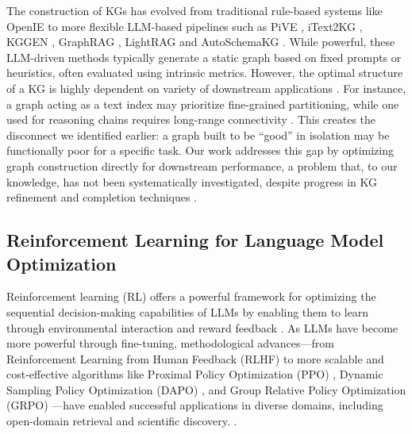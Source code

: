 \documentclass[11pt]{article}
\begin{document}
\newline The construction of KGs has evolved from traditional rule-based systems like OpenIE \citep{angeli_leveraging_2015} to more flexible LLM-based pipelines such as PiVE \citep{han_pive_2024}, iText2KG \citep{lairgi_itext2kg_2024}, KGGEN \citep{mo_kggen_2025}, GraphRAG \citep{edge_local_2025}, LightRAG \citep{guo_lightrag_2025} and AutoSchemaKG \citep{bai_autoschemakg_2025}. While powerful, these LLM-driven methods typically generate a static graph based on fixed prompts or heuristics, often evaluated using intrinsic metrics. However, the optimal structure of a KG is highly dependent on variety of downstream applications \citep{gubanov_cancerkgorg_2024,wu_medical_2024,zhao_agentigraph_2024,he_enhancing_nodate,he_g-retriever_2024, liu_codexgraph_2024, bai_top_2025, huang_atlaskv_2026}. For instance, a graph acting as a text index may prioritize fine-grained partitioning, while one used for reasoning chains requires long-range connectivity \citep{jin_graph_2024,huang_ritek_2024}. This creates the disconnect we identified earlier: a graph built to be ``good'' in isolation may be functionally poor for a specific task. Our work addresses this gap by optimizing graph construction directly for downstream performance, a problem that, to our knowledge, has not been systematically investigated, despite progress in KG refinement and completion techniques \citep{chen_differentiable_nodate, chen_entity_2024, chen_neuro-symbolic_2024, zhang_contrastive_2022, dong_active_2023}.

\subsection{Reinforcement Learning for Language Model Optimization}
Reinforcement learning (RL) \citep{kaelbling_reinforcement_1996} offers a powerful framework for optimizing the sequential decision-making capabilities of LLMs by enabling them to learn through environmental interaction and reward feedback \citep{kaufmann_survey_2024, xi_survey_2025}. As LLMs have become more powerful through fine-tuning, methodological advances—from Reinforcement Learning from Human Feedback (RLHF) \citep{ouyang_training_2022} to more scalable and cost-effective algorithms like Proximal Policy Optimization (PPO) \citep{schulman_proximal_2017}, Dynamic Sampling Policy Optimization (DAPO) \citep{yu_dapo_2025}, and Group Relative Policy Optimization (GRPO) \citep{deepseek-ai_deepseek-r1_2025}—have enabled successful applications in diverse domains, including open-domain retrieval and scientific discovery. \citep{zheng_automation_2025, yu_mathcalb-coder_2024, zhu_convsearch-r1_2025, shen_vlm-r1_2025}.
\end{document}
